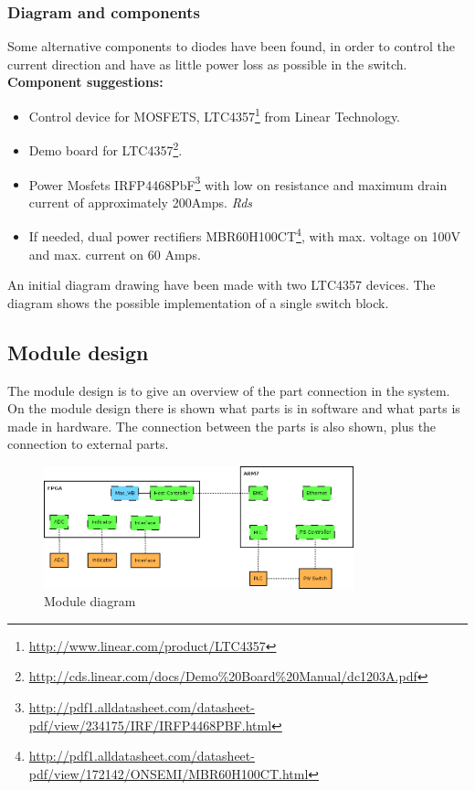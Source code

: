 \subsubsection{Diagram and components}
Some alternative components to diodes have been found, in order to control the current direction and have as little power loss as possible in the switch. 
\textbf{Component suggestions:}
\begin{itemize}
	\item Control device for MOSFETS, LTC4357\footnote{\url{http://www.linear.com/product/LTC4357}} from Linear Technology.
	\item Demo board for LTC4357\footnote{\url{http://cds.linear.com/docs/Demo\%20Board\%20Manual/dc1203A.pdf}}.
	\item Power Mosfets IRFP4468PbF\footnote{\url{http://pdf1.alldatasheet.com/datasheet-pdf/view/234175/IRF/IRFP4468PBF.html}} with low on resistance and maximum drain current of approximately 200Amps. \textit{Rds}
	\item If needed, dual power rectifiers MBR60H100CT\footnote{\url{http://pdf1.alldatasheet.com/datasheet-pdf/view/172142/ONSEMI/MBR60H100CT.html}}, with max. voltage on 100V and max. current on 60 Amps.
\end{itemize}
An initial diagram drawing have been made with two LTC4357 devices. The diagram shows the possible implementation of a single switch block.


\subsection{Module design}

The module design is to give an overview of the part connection in the system. On the module design there is shown what parts is in software and what parts is made in hardware. The connection between the parts is also shown, plus the connection to external parts.

\begin{figure}[H]
	\begin{centering}
		\includegraphics[width=0.8\textwidth,page=1,angle=0]{images/module_design.png}
		\caption{Module diagram}
		\label{fig:module_design_diagram}
	\end{centering}
\end{figure}

